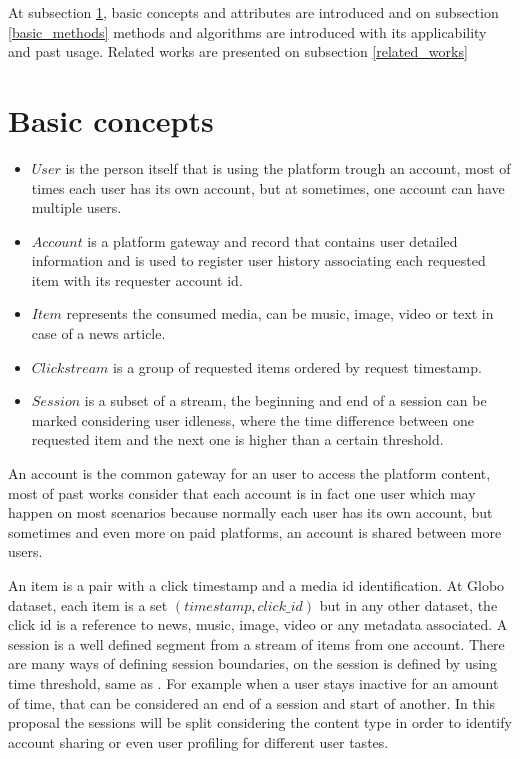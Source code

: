 \documentclass[ecp,tc,english]{iiufrgs}
\begin{document}
At subsection \ref{basic_concepts}, basic concepts and attributes are introduced and on subsection \ref{basic_methods} methods and algorithms are introduced with its applicability and past usage. Related works are presented on subsection \ref{related_works}

    \section{Basic concepts} \label{basic_concepts}
        
        \begin{itemize}
            \item \(User\) is the person itself that is using the platform trough an account, most of times each user has its own account, but at sometimes, one account can have multiple users.        
            \item \(Account\) is a platform gateway and record that contains user detailed information and is used to register user history associating each requested item with its requester account id.
            \item \(Item\) represents the consumed media, can be music, image, video or text in case of a news article.
            \item \(Clickstream\) is a group of requested items ordered by request timestamp.    
            \item \(Session\) is a subset of a stream, the beginning and end of a session can be marked considering user idleness, where the time difference between one requested item and the next one is higher than a certain threshold.
        \end{itemize}

        An account is the common gateway for an user to access the platform content, most of past works consider that each account is in fact one user which may happen on most scenarios because normally each user has its own account, but sometimes and even more on paid platforms, an account is shared between more users.
    
        An item is a pair with a click timestamp and a media id identification. 
        At Globo dataset, each item is a  set \((timestamp, click\_id)\) but 
        in any other dataset, the click id is a reference to news, music, 
        image, video or any metadata associated. A session is a well defined 
        segment from a stream of items from one account. There are many ways 
        of defining session boundaries, on \cite{10.1145/362883.362920} the session 
        is defined by using time threshold, same as \cite{10.1145/2736277.2741117}. 
        For example when a user stays inactive for an amount of time, that can be 
        considered an end of a session and start of another. In this proposal the 
        sessions will be split considering the content type in order to identify 
        account sharing or even user profiling for different user tastes.
\end{document}
